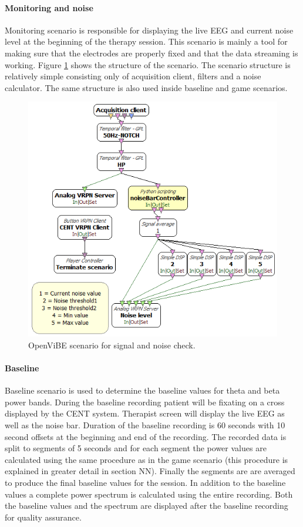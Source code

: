 \paragraph{Monitoring and noise}
Monitoring scenario is responsible for displaying the live EEG and current noise level at the beginning of the therapy session. This scenario is mainly a tool for making sure that the electrodes are properly fixed and that the data streaming is working. Figure \ref{monitoringnoise} shows the structure of the scenario. The scenario structure is relatively simple consisting only of acquisition client, filters and a noise calculator. The same structure is also used inside baseline and game scenarios.

\begin{figure}[h]
	\centering
	\includegraphics[scale=0.4]{noise.png}
	\caption{OpenViBE scenario for signal and noise check.}\label{monitoringnoise}
\end{figure}  

\paragraph{Baseline}
Baseline scenario is used to determine the baseline values for theta and beta power bands. During the baseline recording patient will be fixating on a cross displayed by the CENT system. Therapist screen will display the live EEG as well as the noise bar. Duration of the baseline recording is 60 seconds with 10 second offsets at the beginning and end of the recording. The recorded data is split to segments of 5 seconds and for each segment the power values are calculated using the same procedure as in the game scenario (this procedure is explained in greater detail in section NN). Finally the segments are are averaged to produce the final baseline values for the session. In addition to the baseline values a complete power spectrum is calculated using the entire recording. Both the baseline values and the spectrum are displayed after the baseline recording for quality assurance.


